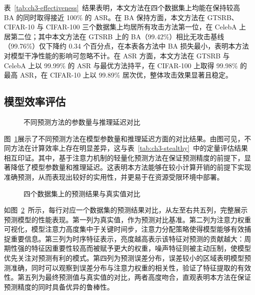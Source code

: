 表~\ref{tab:ch3-effectiveness}~结果表明，本文方法在四个数据集上均能在保持较高 BA 的同时取得接近 100\% 的 ASR。在 BA 保持方面，本文方法在 GTSRB、CIFAR-10 与 CIFAR-100 三个数据集上均居所有攻击方法第一位，在 CelebA 上居第二位；其中本文方法在 GTSRB 上的 BA（99.42\%）相比无攻击基线（99.76\%）仅下降约 0.34 个百分点，在本表各方法中 BA 损失最小，表明本方法对模型干净性能的影响可忽略不计。在 ASR 方面，本文方法在 GTSRB 与 CelebA 上以 99.99\% 的 ASR 与最优方法持平，在 CIFAR-100 上取得 99.98\% 的最高 ASR，在 CIFAR-10 上以 99.89\% 居次优，整体攻击效果显著且稳定。

\FloatBarrier
\subsection{模型效率评估}\label{ux6a21ux578bux6548ux7387ux8bc4ux4f30}

\begin{figure}[htbp]
  \centering
  \caption{不同预测方法的参数量与推理延迟对比}
  \label{fig:ch3-poison-residual}
\end{figure}

图~\ref{fig:ch3-poison-residual}展示了不同预测方法在模型参数量和推理延迟方面的对比结果。由图可见，不同方法在计算效率上存在明显差异，这与表~\ref{tab:ch3-stealthy}~中的定量评估结果相互印证。其中，基于注意力机制的轻量化预测方法在保证预测精度的前提下，显著降低了模型参数量和推理延迟。这表明本方法能够在较小计算开销的前提下实现准确预测，从而表现出较好的实用性，并更易于在资源受限环境中部署。

\begin{figure}[htbp]
\centering
{}
\caption{四个数据集上的预测结果与真实值对比}
\label{fig:ch3-celeb4-panel}
\end{figure}

如图~\ref{fig:ch3-celeb4-panel}~所示，每行对应一个数据集的预测结果对比，从左至右共五列，完整展示预测模型的性能表现。第一列为真实值，作为预测对比基准。第二列为注意力权重可视化，模型注意力高度集中于关键时间步，注意力分配策略使得模型能够有效捕捉重要信息。第三列为时序特征表示，亮度越高表示该特征对预测的贡献越大：周期性强的特征因重要性较高而被赋予更大的权重，噪声特征则被主动压制，使模型优先关注对预测有利的模式。第四列为预测误差分布，误差较小的区域表明模型预测准确，同时可以观察到误差分布与注意力权重的相关性，验证了特征提取的有效性。第五列为最终预测值与真实值的对比，两者高度吻合，直观表明本方法在保证预测精度的同时具备优异的鲁棒性。

